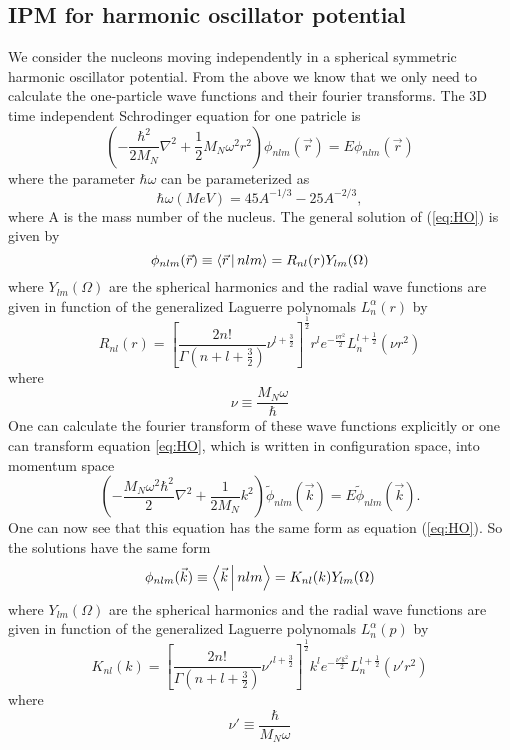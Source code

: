\documentclass[12pt]{article}
\begin{document}
\subsection{IPM for harmonic oscillator potential}
We consider the nucleons moving independently in a spherical symmetric harmonic oscillator potential. From the above we know that we only need to calculate the one-particle wave functions and their fourier transforms. The 3D time independent Schrodinger equation for one patricle is
\begin{equation} \label{eq:HO}
\left( -\frac{\hbar^2}{2M_N} \nabla^2 + \frac{1}{2} M_N \omega^2 r^2 \right) \phi_{nlm}(\vec{r}) = E\phi_{nlm}(\vec{r})
\end{equation}
where the parameter $\hbar\omega$ can be parameterized as
\begin{equation}
\hbar\omega (MeV) = 45A^{-1/3}-25A^{-2/3},
\end{equation}
where A is the mass number of the nucleus. The general solution of (\ref{eq:HO}) is given by
\begin{equation}
\phi_{nlm}(\vec{r}) \equiv \Braket{\vec{r}|nlm} = R_{nl}(r)Y_{lm}(\Omega)	
\end{equation}
where $Y_{lm}(\Omega)$ are the spherical harmonics and the radial wave functions are given in function of the generalized Laguerre polynomals $L^\alpha_n(r)$ by
\begin{equation}
 R_{nl}(r) = \left[ \frac{2n!}{\Gamma(n+l+\frac{3}{2})}\nu^{l+\frac{3}{2}} \right]^{\frac{1}{2}} r^l e^{-\frac{\nu r^2}{2}} L^{l+\frac{1}{2}}_n(\nu r^2)
\end{equation}
where 
\begin{equation}
\nu \equiv \frac{M_N \omega}{\hbar}
\end{equation}
One can calculate the fourier transform of these wave functions explicitly or one can transform equation \ref{eq:HO}, which is written in configuration space, into momentum space
\begin{equation} \label{eq:HO_momentum}
\left( -\frac{M_N \omega^2 \hbar^2}{2} \nabla^2 + \frac{1}{2M_N} k^2 \right) \tilde{\phi}_{nlm}(\vec{k}) = E\tilde{\phi}_{nlm}(\vec{k}).
\end{equation}
One can now see that this equation has the same form as equation (\ref{eq:HO}). So the solutions have the same form
\begin{equation}
\phi_{nlm}(\vec{k}) \equiv \Braket{\vec{k}|nlm} = K_{nl}(k)Y_{lm}(\Omega)	
\end{equation}
where $Y_{lm}(\Omega)$ are the spherical harmonics and the radial wave functions are given in function of the generalized Laguerre polynomals $L^\alpha_n(p)$ by
\begin{equation}
 K_{nl}(k) = \left[ \frac{2n!}{\Gamma(n+l+\frac{3}{2})}\nu'^{l+\frac{3}{2}} \right]^{\frac{1}{2}} k^l e^{-\frac{\nu' k^2}{2}} L^{l+\frac{1}{2}}_n(\nu' r^2)
\end{equation}
where 
\begin{equation}
\nu' \equiv \frac{\hbar}{M_N \omega}
\end{equation}
\end{document}
